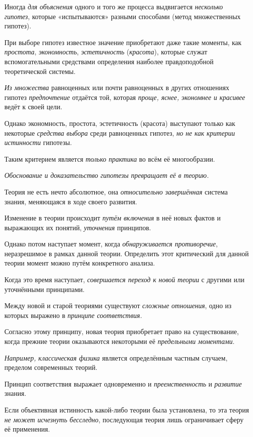 \documentclass[a4paper,14pt,russian]{extreport}
\begin{document}
Иногда \emph{для объяснения} одного и того же процесса выдвигается \emph{несколько гипотез}, которые «испытываются» разными способами (метод множественных гипотез).

При выборе гипотез известное значение приобретают даже такие моменты, как \emph{простота}, \emph{экономность}, \emph{эстетичность} (\emph{красота}), которые служат вспомогательными средствами определения наиболее правдоподобной теоретической системы.

\emph{Из множества} равноценных или почти равноценных в других отношениях гипотез \emph{предпочтение} отдаётся той, которая \emph{проще, яснее, экономнее и красивее} ведёт к своей цели.

Однако экономность, простота, эстетичность (красота) выступают только как некоторые \emph{средства выбора} среди равноценных гипотез, \emph{но не как критерии истинности} гипотезы.

Таким критерием является \emph{только практика} во всём её многообразии.

\emph{Обоснование и доказательство гипотезы превращает её в теорию.}

Теория не есть нечто абсолютное, она \emph{относительно завершённая} система знания, меняющаяся в ходе своего развития.

Изменение в теории происходит \emph{путём включения} в неё новых фактов и выражающих их понятий, \emph{уточнения} принципов.

Однако потом наступает момент, когда \emph{обнаруживается противоречие}, неразрешимое в рамках данной теории. Определить этот критический для данной теории момент можно путём конкретного анализа.

Когда это время наступает, \emph{совершается переход к новой теории} с другими или уточнёнными принципами.

Между новой и старой теориями существуют \emph{сложные отношения}, одно из которых выражено в \emph{принципе соответствия.}

Согласно этому принципу, новая теория приобретает право на существование, когда прежние теории оказываются некоторыми её \emph{предельными моментами}.

\emph{Например, классическая физика} является определённым частным случаем, пределом современных теорий.

Принцип соответствия выражает одновременно и \emph{преемственность} и \emph{развитие} знания.

Если объективная истинность какой-либо теории была установлена, то эта теория \emph{не может исчезнуть бесследно}, последующая теория лишь ограничивает сферу её применения.
\end{document}
